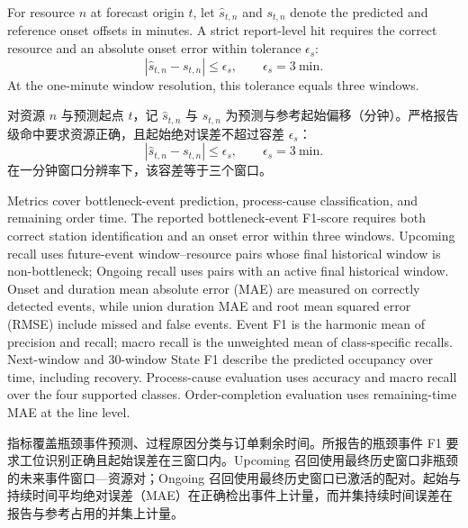 \documentclass[a4paper,fleqn]{cas-dc}
\newcommand{\zhpara}[1]{%
  \par\begingroup\small\color{black!72}\noindent #1\par\endgroup}
\begin{document}
For resource $n$ at forecast origin $t$, let $\hat s_{t,n}$ and $s_{t,n}$ denote the predicted and reference onset offsets in minutes. A strict report-level hit requires the correct resource and an absolute onset error within tolerance $\epsilon_s$:
\begin{equation}
|\hat{s}_{t,n}-s_{t,n}|\leq\epsilon_s,\qquad
\epsilon_s=3~\mathrm{min}.
\end{equation}
At the one-minute window resolution, this tolerance equals three windows.

\zhpara{对资源 $n$ 与预测起点 $t$，记 $\hat s_{t,n}$ 与 $s_{t,n}$ 为预测与参考起始偏移（分钟）。严格报告级命中要求资源正确，且起始绝对误差不超过容差 $\epsilon_s$：
\begin{equation}
|\hat{s}_{t,n}-s_{t,n}|\leq\epsilon_s,\qquad
\epsilon_s=3~\mathrm{min}.
\end{equation}
在一分钟窗口分辨率下，该容差等于三个窗口。}


Metrics cover bottleneck-event prediction, process-cause classification, and remaining order time. The reported bottleneck-event F1-score requires both correct station identification and an onset error within three windows. Upcoming recall uses future-event window--resource pairs whose final historical window is non-bottleneck; Ongoing recall uses pairs with an active final historical window. Onset and duration mean absolute error (MAE) are measured on correctly detected events, while union duration MAE and root mean squared error (RMSE) include missed and false events. Event F1 is the harmonic mean of precision and recall; macro recall is the unweighted mean of class-specific recalls. Next-window and 30-window State F1 describe the predicted occupancy over time, including recovery. Process-cause evaluation uses accuracy and macro recall over the four supported classes. Order-completion evaluation uses remaining-time MAE at the line level.

\zhpara{指标覆盖瓶颈事件预测、过程原因分类与订单剩余时间。所报告的瓶颈事件 F1 要求工位识别正确且起始误差在三窗口内。Upcoming 召回使用最终历史窗口非瓶颈的未来事件窗口—资源对；Ongoing 召回使用最终历史窗口已激活的配对。起始与持续时间平均绝对误差（MAE）在正确检出事件上计量，而并集持续时间误差在报告与参考占用的并集上计量。}
\end{document}
